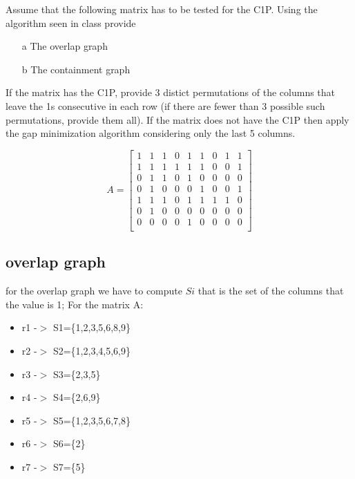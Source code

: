 \documentclass[]{article}
\begin{document}
Assume that the following matrix has to be tested for the C1P. Using the algorithm seen in class provide 
\begin{enumerate}

\item[a] The overlap graph
\item[b] The containment graph

\end{enumerate}

If the matrix has the C1P, provide 3 distict permutations of the columns that leave the 1s consecutive
in each row (if there are fewer than 3 possible such permutations, provide them all). If the matrix does not have the C1P then apply the gap minimization algorithm considering only the last 5 columns.


\[A=\begin{bmatrix}
1 & 1 & 1 & 0 & 1 & 1 & 0 & 1 & 1 \\
1 & 1 & 1 & 1 & 1 & 1 & 0 & 0 & 1 \\
0 & 1 & 1 & 0 & 1 & 0 & 0 & 0 & 0 \\
0 & 1 & 0 & 0 & 0 & 1 & 0 & 0 & 1 \\
1 & 1 & 1 & 0 & 1 & 1 & 1 & 1 & 0 \\
0 & 1 & 0 & 0 & 0 & 0 & 0 & 0 & 0 \\
0 & 0 & 0 & 0 & 1 & 0 & 0 & 0 & 0 \\
\end{bmatrix}\]



\subsection{overlap graph}

for the overlap graph we have to compute $Si$ that is the set of the columns that the value is 1;
For the matrix A:

\begin{itemize}

\item r1 -$>$ S1=\{1,2,3,5,6,8,9\}
\item r2 -$>$ S2=\{1,2,3,4,5,6,9\}
\item r3 -$>$ S3=\{2,3,5\}
\item r4 -$>$ S4=\{2,6,9\}
\item r5 -$>$ S5=\{1,2,3,5,6,7,8\}
\item r6 -$>$ S6=\{2\}
\item r7 -$>$ S7=\{5\}

\end{itemize}
\end{document}
